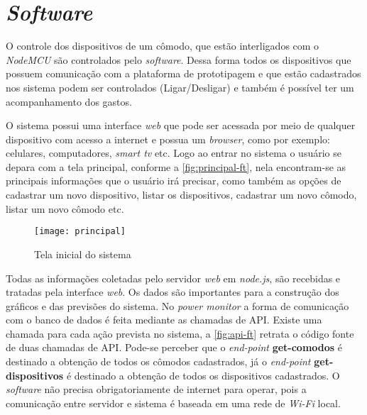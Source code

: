 \section[\textit{Software}]{\textit{Software}}\label{soft-sec}
O controle dos dispositivos de um cômodo, que estão interligados com o \textit{NodeMCU} são controlados pelo \textit{software}. Dessa forma
todos os dispositivos que possuem comunicação com a plataforma de prototipagem e que estão cadastrados nos sistema podem ser controlados (Ligar/Desligar) e também
é possível ter um acompanhamento dos gastos.

O sistema possui uma interface \textit{web} que pode ser acessada por meio de qualquer dispositivo com acesso a internet e possua um 
\textit{browser}, como por exemplo: celulares, computadores, \textit{smart tv} etc.
Logo ao entrar no sistema o usuário se depara com a tela principal, conforme a \autoref{fig:principal-ft}, nela encontram-se
as principais informações que o usuário irá precisar, como também as opções de cadastrar um novo dispositivo, listar os dispositivos, cadastrar um novo cômodo,
listar um novo cômodo etc.

\begin{figure}[h!]
	\texttt{[image: principal]}
	\centering
	\caption[Tela inicial do sistema]{Tela inicial do sistema}
	\label{fig:principal-ft}
\end{figure}
\FloatBarrier

Todas as informações coletadas pelo servidor \textit{web} em \textit{node.js}, são recebidas e tratadas pela interface \textit{web}. 
Os dados são importantes para a construção dos gráficos e das previsões do sistema. No \textit{power monitor}
a forma de comunicação com o banco de dados é feita mediante as chamadas de API. Existe uma chamada para cada ação prevista no sistema, a \autoref{fig:api-ft}
retrata o código fonte de duas chamadas de API. Pode-se perceber que o \textit{end-point\protect\footnotemark}
\textbf{get-comodos} é destinado a obtenção de todos os cômodos cadastrados, já o \textit{end-point} \textbf{get-dispositivos} é destinado a 
obtenção de todos os dispositivos cadastrados. O \textit{software} não precisa obrigatoriamente de internet para operar, pois a comunicação entre servidor e sistema é
baseada em uma rede de \textit{Wi-Fi} local. 


